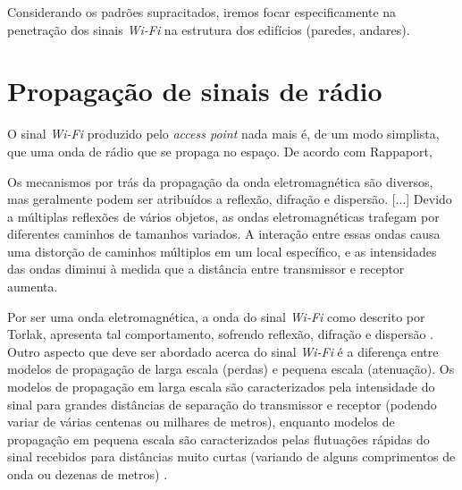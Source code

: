 \documentclass[
	12pt,				%
	twoside,			%
	a4paper,			%
	english,			%
	french,				%
	spanish,			%
	brazil				%
	]{abntex2}
\begin{document}
Considerando os padrões supracitados, iremos focar especificamente na
penetração dos sinais \emph{Wi-Fi} na estrutura dos edifícios (paredes,
andares).

\section{Propagação de sinais de
rádio}\label{propagauxe7uxe3o-de-sinais-de-ruxe1dio}

O sinal \emph{Wi-Fi} produzido pelo \emph{access point} nada mais é, de
um modo simplista, que uma onda de rádio que se propaga no espaço. De
acordo com Rappaport,

\begin{citacao}
    Os mecanismos por trás da propagação da onda eletromagnética são diversos, mas geralmente podem ser atribuídos a reflexão, difração e dispersão. [...] Devido a múltiplas reflexões de vários objetos, as ondas eletromagnéticas trafegam por diferentes caminhos de tamanhos variados. A interação entre essas ondas causa uma distorção de caminhos múltiplos em um local específico, e as intensidades das ondas diminui à medida que a distância entre transmissor e receptor aumenta. \cite[p. 72]{RAPPAPORT}
    
\end{citacao}

Por ser uma onda eletromagnética, a onda do sinal \emph{Wi-Fi} como
descrito por Torlak, apresenta tal comportamento, sofrendo reflexão,
difração e dispersão \cite{TORLAK}. Outro aspecto que deve ser abordado
acerca do sinal \emph{Wi-Fi} é a diferença entre modelos de propagação
de larga escala (perdas) e pequena escala (atenuação). Os modelos de
propagação em larga escala são caracterizados pela intensidade do sinal
para grandes distâncias de separação do transmissor e receptor (podendo
variar de várias centenas ou milhares de metros), enquanto modelos de
propagação em pequena escala são caracterizados pelas flutuações rápidas
do sinal recebidos para distâncias muito curtas (variando de alguns
comprimentos de onda ou dezenas de metros) \cite[p. 72]{RAPPAPORT}.
\end{document}
